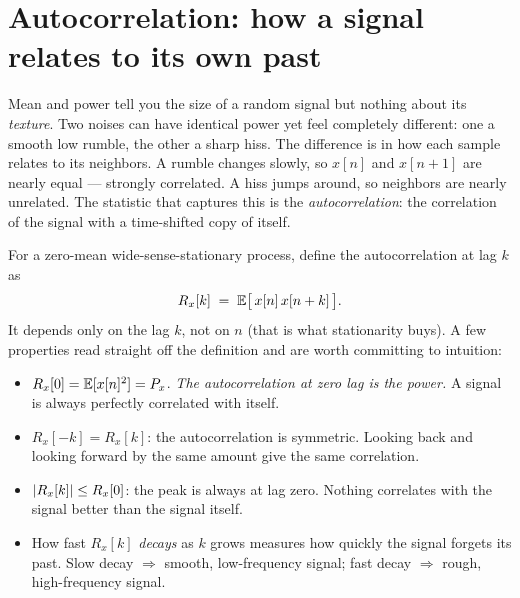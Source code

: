 \section{Autocorrelation: how a signal relates to its own past}
\label{ch20:autocorr}

Mean and power tell you the size of a random signal but nothing about its
\emph{texture}. Two noises can have identical power yet feel completely
different: one a smooth low rumble, the other a sharp hiss. The difference is in
how each sample relates to its neighbors. A rumble changes slowly, so $x[n]$ and
$x[n{+}1]$ are nearly equal --- strongly correlated. A hiss jumps around, so
neighbors are nearly unrelated. The statistic that captures this is the
\emph{autocorrelation}: the correlation of the signal with a time-shifted copy
of itself.

For a zero-mean wide-sense-stationary process, define the autocorrelation at lag
$k$ as
\begin{equation}
  R_x[k] \;=\; \operatorname{\mathbb{E}}\bigl[\,x[n]\,x[n+k]\,\bigr].
  \label{ch20:Rdef}
\end{equation}
It depends only on the lag $k$, not on $n$ (that is what stationarity buys). A
few properties read straight off the definition and are worth committing to
intuition:

\begin{itemize}
  \item $R_x[0] = \operatorname{\mathbb{E}}[x[n]^2] = P_x$. \emph{The autocorrelation at zero lag is the
        power.} A signal is always perfectly correlated with itself.
  \item $R_x[-k] = R_x[k]$: the autocorrelation is symmetric. Looking back and
        looking forward by the same amount give the same correlation.
  \item $\lvert R_x[k]\rvert \le R_x[0]$: the peak is always at lag zero. Nothing
        correlates with the signal better than the signal itself.
  \item How fast $R_x[k]$ \emph{decays} as $k$ grows measures how quickly the
        signal forgets its past. Slow decay $\Rightarrow$ smooth, low-frequency
        signal; fast decay $\Rightarrow$ rough, high-frequency signal.
\end{itemize}

